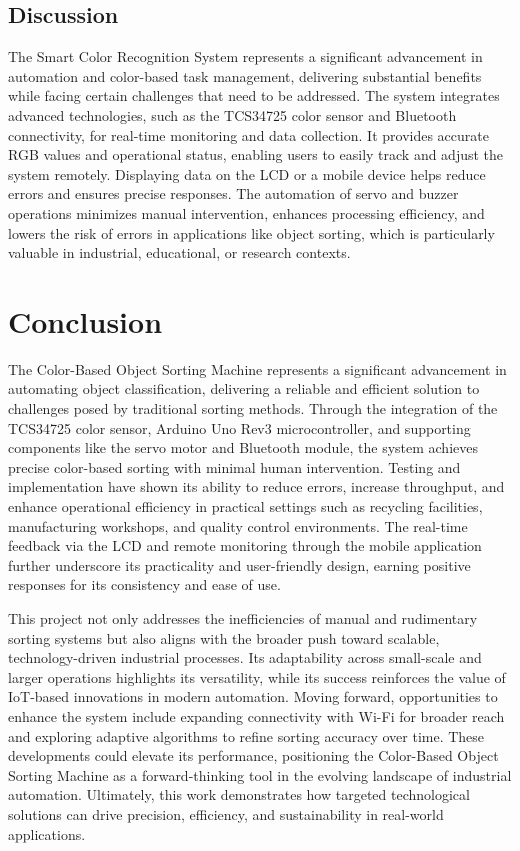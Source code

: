 \documentclass[conference, onecolumn]{IEEEtran}
\begin{document}
\subsection{\textbf{Discussion}}
The Smart Color Recognition System represents a significant advancement in automation and color-based task management, delivering substantial benefits while facing certain challenges that need to be addressed. The system integrates advanced technologies, such as the TCS34725 color sensor and Bluetooth connectivity, for real-time monitoring and data collection. It provides accurate RGB values and operational status, enabling users to easily track and adjust the system remotely. Displaying data on the LCD or a mobile device helps reduce errors and ensures precise responses. The automation of servo and buzzer operations minimizes manual intervention, enhances processing efficiency, and lowers the risk of errors in applications like object sorting, which is particularly valuable in industrial, educational, or research contexts.

\section{Conclusion}

The Color-Based Object Sorting Machine represents a significant advancement in automating object classification, delivering a reliable and efficient solution to challenges posed by traditional sorting methods. Through the integration of the TCS34725 color sensor, Arduino Uno Rev3 microcontroller, and supporting components like the servo motor and Bluetooth module, the system achieves precise color-based sorting with minimal human intervention. Testing and implementation have shown its ability to reduce errors, increase throughput, and enhance operational efficiency in practical settings such as recycling facilities, manufacturing workshops, and quality control environments. The real-time feedback via the LCD and remote monitoring through the mobile application further underscore its practicality and user-friendly design, earning positive responses for its consistency and ease of use.

This project not only addresses the inefficiencies of manual and rudimentary sorting systems but also aligns with the broader push toward scalable, technology-driven industrial processes. Its adaptability across small-scale and larger operations highlights its versatility, while its success reinforces the value of IoT-based innovations in modern automation. Moving forward, opportunities to enhance the system include expanding connectivity with Wi-Fi for broader reach and exploring adaptive algorithms to refine sorting accuracy over time. These developments could elevate its performance, positioning the Color-Based Object Sorting Machine as a forward-thinking tool in the evolving landscape of industrial automation. Ultimately, this work demonstrates how targeted technological solutions can drive precision, efficiency, and sustainability in real-world applications.
\end{document}
